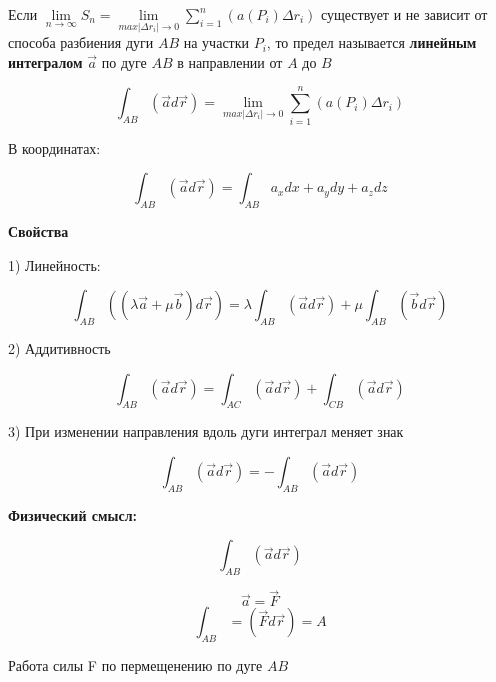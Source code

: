 

Если $\lim\limits_{n\to\infty}S_n = \lim\limits_{max|\Delta r_i|\to 0}\sum\limits_{i=1}^{n}(a(P_i)\Delta r_i) $ существует и не зависит от способа разбиения дуги $AB$ на участки $P_i$, то предел называется \textbf{линейным интегралом} $\overrightarrow{a}$ по дуге $AB$ в направлении от $A$ до $B$

$$\int_{AB} (\overrightarrow{a}d\overrightarrow{r}) = \lim\limits_{max|\Delta r_i|\to 0}\sum\limits_{i=1}^{n}(a(P_i)\Delta r_i)$$

В координатах:

$$\int_{AB}(\overrightarrow{a}d\overrightarrow{r}) = \int_{AB}a_xdx + a_ydy+a_zdz$$

\textbf{Свойства}

1) Линейность:

$$\int_{AB} ((\lambda\overrightarrow{a} + \mu\overrightarrow{b})d\overrightarrow{r}) = \lambda\int_{AB}(\overrightarrow{a}d\overrightarrow{r})+ \mu\int_{AB}(\overrightarrow{b}d\overrightarrow{r})$$

2) Аддитивность

$$\int_{AB}  (\overrightarrow{a}d\overrightarrow{r}) = \int_{AC}  (\overrightarrow{a}d\overrightarrow{r}) + \int_{CB}  (\overrightarrow{a}d\overrightarrow{r})$$

3) При изменении направления вдоль дуги интеграл меняет знак

$$\int_{AB}  (\overrightarrow{a}d\overrightarrow{r}) = - \int_{AB}  (\overrightarrow{a}d\overrightarrow{r})$$

\textbf{Физический смысл:}

$$\int_{AB} (\overrightarrow{a}d\overrightarrow{r})$$

$$\overrightarrow{a} = \overrightarrow{F}$$
$$\int_{AB} = (\overrightarrow{F}d\overrightarrow{r}) = A$$

Работа силы F по пермещенению по дуге $AB$